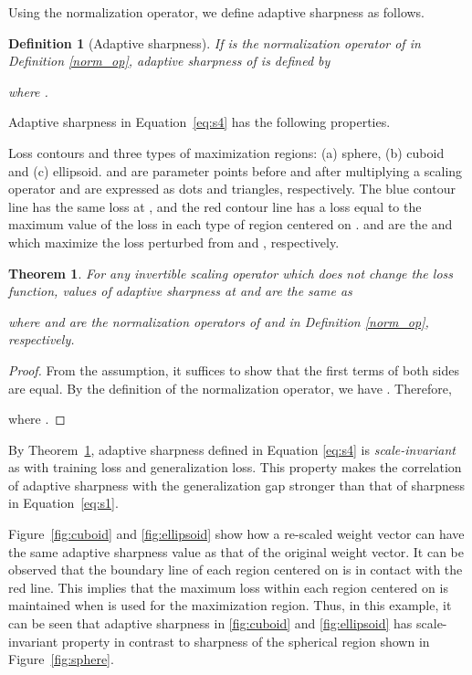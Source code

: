 \documentclass{article}
\newtheorem{thm}{Theorem}
\newtheorem{defi}{Definition}
\begin{document}
Using the normalization operator, we define adaptive sharpness as follows.
\begin{defi}[Adaptive sharpness]
If  is the normalization operator of  in Definition \ref{norm_op}, adaptive sharpness of  is defined by

where .
\end{defi}

Adaptive sharpness in Equation~\ref{eq:s4} has the following properties.

\beginfigure
\centering    
{}
\caption{Loss contours and three types of maximization regions: (a) sphere, (b) cuboid and (c) ellipsoid.  and  are parameter points before and after multiplying a scaling operator  and are expressed as dots and triangles, respectively. The blue contour line has the same loss at , and the red contour line has a loss equal to the maximum value of the loss in each type of region centered on .  and  are the  and  which maximize the loss perturbed from  and , respectively.}
\label{fig1}
\jmkendfigure

\begin{thm} \label{thm1}
	For any invertible scaling operator  which does not change the loss function, values of adaptive sharpness at  and  are the same as
	
	where  and  are the normalization operators of  and  in Definition \ref{norm_op}, respectively. 
\end{thm}
\begin{proof}
	From the assumption, it suffices to show that the first terms of both sides are equal.
	By the definition of the normalization operator, we have .
	Therefore,
	
	where .
\end{proof}


By Theorem~\ref{thm1}, adaptive sharpness defined in Equation \ref{eq:s4} is \textit{scale-invariant} as with training loss and generalization loss. 
This property makes the correlation of adaptive sharpness with the generalization gap stronger than that of sharpness in Equation~\ref{eq:s1}.

Figure~\ref{fig:cuboid} and \ref{fig:ellipsoid} show how a re-scaled weight vector can have the same adaptive sharpness value as that of the original weight vector. It can be observed that the boundary line of each region centered on  is in contact with the red line. This implies that the maximum loss within each region centered on  is maintained when  is used for the maximization region. Thus, in this example, it can be seen that adaptive sharpness in \ref{fig:cuboid} and \ref{fig:ellipsoid} has scale-invariant property in contrast to sharpness of the spherical region shown in Figure~\ref{fig:sphere}.
\end{document}
